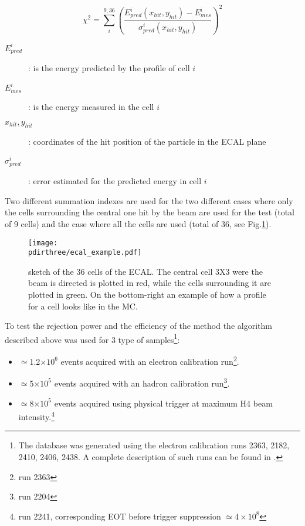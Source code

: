 \begin{equation}
  \chi^2 = \sum^{9,36}_i \left(\frac{E_{pred}^i(x_{hit},y_{hit})-E_{mes}^i}{\sigma^{i}_{pred}(x_{hit},y_{hit})}\right)^2
  \label{eqn:chi}
\end{equation}


\begin{description}
\item[$E_{pred}^i$]: is the energy predicted by the profile of cell
  $i$
\item[$E_{mes}^i$]: is the energy measured in the cell $i$
\item[$x_{hit},y_{hit}$]: coordinates of the hit position of the
  particle in the ECAL plane
\item [$\sigma^{i}_{pred}$]: error estimated for the predicted energy
  in cell $i$
\end{description}


Two different summation indexes are used for the two different cases
where only the cells surrounding the central one hit by the beam are
used for the test (total of 9 cells) and the case where all the cells
are used (total of 36, see Fig.\ref{fig:ecal_example}).

\begin{figure}[h!]
  \begin{center}
    \texttt{[image: \\pdirthree/ecal\_example.pdf]}
  \end{center}
  \caption[ECAL sketch]{sketch of the 36 cells of the ECAL. The central cell 3X3
    were the beam is directed is plotted in red, while the cells
    surrounding it are plotted in green. On the bottom-right an
    example of how a profile for a cell looks like in the MC.}
  \label{fig:ecal_example}
\end{figure}

To test the rejection power and the efficiency of the
method the algorithm described above was used for 3 type of samples\footnote{The database was generated using the electron  calibration runs 2363, 2182, 2410, 2406, 2438. A complete description of such runs can be found in \cite{na64-runs}. }:
\begin{itemize}
\item $\simeq$1.2$\times 10^{6}$ events acquired with an electron calibration run\footnote{run 2363}.
\item $\simeq$5$\times 10^{5}$ events acquired with an hadron calibration run\footnote{run 2204}.
\item $\simeq$8$\times 10^{5}$ events acquired using physical trigger at maximum H4 beam intensity.\footnote{run 2241, corresponding EOT before trigger suppression $\simeq 4 \times 10^{8}$}
\end{itemize}

